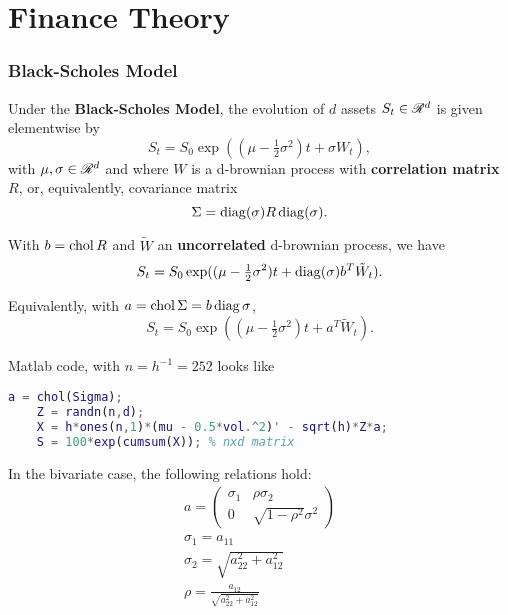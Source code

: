 \documentclass[10pt]{article}
\begin{document}
\part{Finance Theory}

\section{Black-Scholes Model}
\begin{outline}
  \1 Under the \textbf{Black-Scholes Model}, the evolution of $d$ assets $S_t\in\mathscr{R}^d$ is
  given elementwise by
  \begin{equation*}
    S_t = S_0\exp((\mu - \tfrac{1}{2}\sigma^2)t + \sigma W_t),
  \end{equation*}
  with $\mu,\sigma\in\mathscr{R}^d$ and where $W$ is a d-brownian process with \textbf{correlation
  matrix} $R$, or, equivalently, covariance matrix
  \begin{equation*}
    \Sigma=\operatorname{diag}(\sigma)R\operatorname{diag}(\sigma).
  \end{equation*}

  \1 With $b=\operatorname{chol} R$ and $\tilde W$ an \textbf{uncorrelated} d-brownian process, we have
  \begin{equation*}
    S_t = S_0\exp((\mu - \tfrac{1}{2}\sigma^2)t + \operatorname{diag}(\sigma)b^T\tilde W_t).
  \end{equation*}

  \1 Equivalently, with $a=\operatorname{chol}\Sigma = b\operatorname{diag}\sigma$,
  \begin{equation*}
    S_t = S_0\exp((\mu - \tfrac{1}{2}\sigma^2)t + a^T\tilde W_t).
  \end{equation*}

  \1 Matlab code, with $n=h^{-1}=252$ looks like
  \begin{lstlisting}[language=Matlab,basicstyle=\footnotesize,numberstyle=\tiny]
    a = chol(Sigma);
    Z = randn(n,d);
    X = h*ones(n,1)*(mu - 0.5*vol.^2)' - sqrt(h)*Z*a;
    S = 100*exp(cumsum(X)); % nxd matrix
  \end{lstlisting}

  \1 In the bivariate case, the following relations hold:
  \begin{gather*}
    a = \begin{pmatrix}\sigma_1 & \rho\sigma_2\\0&\sqrt{1-\rho^2}\sigma^2\end{pmatrix}\\
    \sigma_1 = a_{11}\\
    \sigma_2 = \sqrt{a_{22}^2 + a_{12}^2}\\
    \rho = \frac{a_{12}}{\sqrt{a_{22}^2 + a_{12}^2}}\\
  \end{gather*}
\end{outline}
\end{document}
